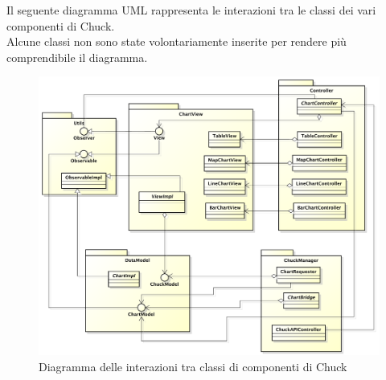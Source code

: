 Il seguente diagramma UML rappresenta le interazioni tra le classi dei vari componenti di Chuck.\\
	Alcune classi non sono state volontariamente inserite per rendere più comprendibile il diagramma.

	\begin{figure}[H]\centering
		\includegraphics[width=\textwidth]{SpecificaTecnica/Pics/InterazioniComponentiChuck.pdf}
		\caption{Diagramma delle interazioni tra classi di componenti di Chuck}
	\end{figure}